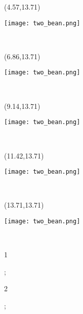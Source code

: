 \documentclass[a4paper]{article}
\newcommand{\myXtwoBean}[0]{
\texttt{[image: two\_bean.png]}
}
\newcommand{\mycard}[5]{%
	\vspace{0.35cm}
	\tiny #1 #2
	\parbox[t][2.29\TPVertModule][c]{0.150\paperwidth}{%
	\hspace{-0.65cm} \large#3\\
	}
}
\begin{document}
\begin{textblock}{2.29}(4.57,13.71)
\mycard{}{}{
\myXtwoBean
}{}{} 
\end{textblock}

\begin{textblock}{2.29}(6.86,13.71)
\mycard{}{}{
\myXtwoBean
}{}{} 
\end{textblock}

\begin{textblock}{2.29}(9.14,13.71)
\mycard{}{}{
\myXtwoBean
}{}{} 
\end{textblock}

\begin{textblock}{2.29}(11.42,13.71)
\mycard{}{}{
\myXtwoBean
}{}{} 
\end{textblock}

\begin{textblock}{2.29}(13.71,13.71)
\mycard{}{}{
\myXtwoBean
}{}{} 
\end{textblock}









\begin{tiny}1\end{tiny}\newpage;
















\begin{tiny}2\end{tiny};
\end{document}
